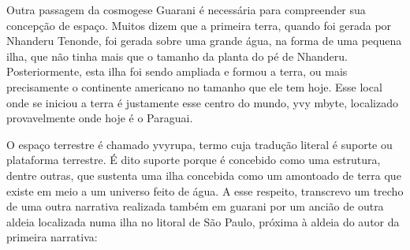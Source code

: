 \documentclass{article}
\begin{document}
Outra passagem da cosmogese Guarani \'e necess\'aria para compreender
sua concep\c{c}\~ao de espa\c{c}o. Muitos dizem que a primeira terra,
quando foi gerada por Nhanderu Tenonde, foi gerada sobre uma grande
\'agua, na forma de uma pequena ilha, que n\~ao tinha mais que o
tamanho da planta do p\'e de Nhanderu. Posteriormente, esta ilha foi
sendo ampliada e formou a terra, ou mais precisamente o continente
americano no tamanho que ele tem hoje. Esse local onde se iniciou a
terra \'e justamente esse centro do mundo, yvy mbyte, localizado
provavelmente onde hoje \'e o Paraguai.

O espa\c{c}o terrestre \'e chamado yvyrupa, termo cuja tradu\c{c}\~ao
literal \'e suporte ou plataforma terrestre. \'E dito suporte porque
\'e concebido como uma estrutura, dentre outras, que sustenta uma ilha
concebida como um amontoado de terra que existe em meio a um universo
feito de \'agua. A esse respeito, transcrevo um trecho de uma outra
narrativa realizada tamb\'em em guarani por um anci\~ao de outra aldeia
localizada numa ilha no litoral de S\~ao Paulo, pr\'oxima \`a aldeia do
autor da primeira narrativa:
\end{document}
